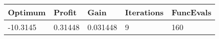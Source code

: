 \begin{tabular}{lllll}
Optimum & Profit & Gain & Iterations & FuncEvals \\ 
\hline 
-10.3145 & 0.31448 & 0.031448 & 9 & 160 \\ 
\hline 
\end{tabular}